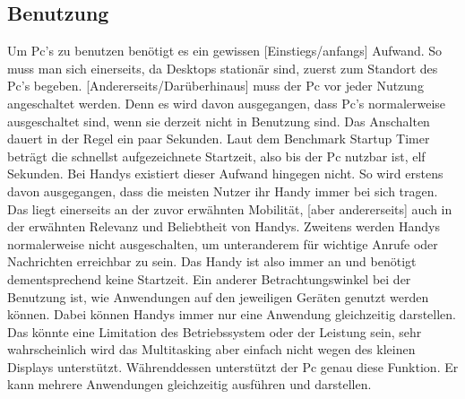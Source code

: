 \subsection{Benutzung}\myTodo
	Um Pc's zu benutzen benötigt es ein gewissen [Einstiegs/anfangs] Aufwand. %
		So muss man sich einerseits, da Desktops stationär sind, zuerst zum Standort des Pc's begeben. %
		[Andererseits/Darüberhinaus] muss der Pc vor jeder Nutzung angeschaltet werden. Denn es wird davon ausgegangen, dass Pc's normalerweise ausgeschaltet sind, wenn sie derzeit nicht in Benutzung sind. Das Anschalten dauert in der Regel ein paar Sekunden. Laut dem Benchmark \glqq Startup Timer\grqq{} beträgt die schnellst aufgezeichnete Startzeit, also bis der Pc nutzbar ist, elf Sekunden\cite{pcVsphone_boottime}.\newline%
	Bei Handys existiert dieser Aufwand hingegen nicht. %
		So wird erstens davon ausgegangen, dass die meisten Nutzer ihr Handy immer bei sich tragen. Das liegt einerseits an der zuvor erwähnten Mobilität, [aber andererseits] auch in der  erwähnten Relevanz und Beliebtheit von Handys. %
		Zweitens werden Handys normalerweise nicht ausgeschalten, um unteranderem für wichtige Anrufe oder Nachrichten erreichbar zu sein. Das Handy ist also immer an und benötigt dementsprechend keine Startzeit.\newline%
Ein anderer Betrachtungswinkel bei der Benutzung ist, wie Anwendungen auf den jeweiligen Geräten genutzt werden können. %
	Dabei können Handys immer nur eine Anwendung gleichzeitig darstellen. Das könnte eine Limitation des Betriebssystem oder der Leistung sein, sehr wahrscheinlich wird das Multitasking aber einfach nicht wegen des kleinen Displays unterstützt.\newline%
	Währenddessen unterstützt der Pc genau diese Funktion. Er kann mehrere Anwendungen gleichzeitig ausführen und darstellen.%
	
	
